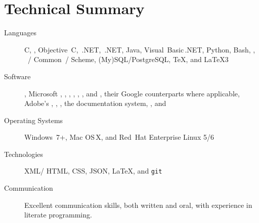 \documentclass{bettercv}
\begin{document}
\maketitle
\section{Technical Summary}

\begin{description}
\item[Languages]
  C,
  \CPP,
  Objective~C,
  \CPP\,.NET,
  \CSharp\,.NET,
  Java,
  Visual~Basic\,.NET,
  Python,
  Bash,
  ,
  ~\Lisp\slash
            Common~\Lisp\slash
            Scheme,
  (My)SQL\slash PostgreSQL,
  \TeX,
  and \LaTeX3

\item[Software]
  ,
  Microsoft ,
            ,
            ,
            ,
            ,
            ,
            and ,
  their Google counterparts where applicable,
  Adobe's
    ,
    ,
    ,
  the  documentation system,
  ,
  and

\item[Operating Systems]
  Windows~7+,
  Mac OS\,X,
  and
  Red~Hat Enterprise Linux 5\slash 6

\item[Technologies]
  XML\slash
  HTML,
  CSS,
  JSON,
  \LaTeX,
  and \texttt{git}

\item[Communication]
  Excellent communication skills, both written and oral,
    with experience in literate programming.
\end{description}
\end{document}
